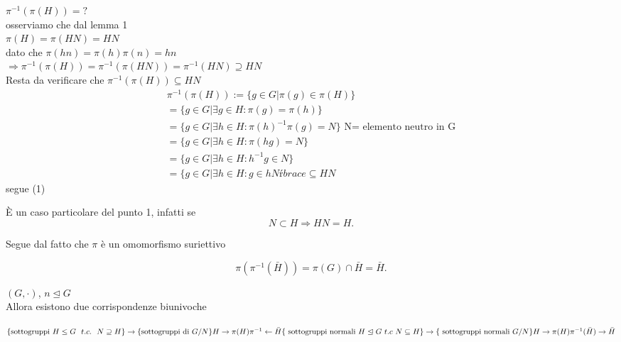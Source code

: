 \documentclass[12px]{article}
\begin{document}
	  \begin{dimo}[1]
		  $\pi^{-1}(\pi(H)) = ?$\\
		  osserviamo che dal lemma 1\\
		   $\pi(H) = \pi(HN) = HN$\\
		   dato che  $\pi(hn) = \pi(h)\pi(n) = hn$\\
		   $ \Rightarrow \pi^{-1}(\pi(H)) = \pi^{-1}(\pi(HN)) = \pi^{-1}(HN)\supseteq HN$ \\
		   Resta da verificare che $\pi^{-1}(\pi(H))\subseteq HN$\\
		    \begin{gather*}
			    \pi^{-1}(\pi(H)):=\lbrace g\in G|\pi(g)\in \pi(H)\rbrace\\
			    =\lbrace g\in G|\exists g\in H:\pi(g) = \pi(h)\rbrace\\
			    =\lbrace g\in G| \exists h\in H: \pi(h)^{-1}\pi(g)=N\rbrace \text{ N= elemento neutro in G}\\
			    =\lbrace g\in G|\exists h\in H: \pi(hg) = N\rbrace\\
			    =\lbrace g\in G | \exists h\in H: h^{-1}g\in N\rbrace\\
			    =\lbrace g\in G | \exists h\in H: g\in hNŕbrace \subseteq HN
		   \end{gather*}
		   segue (1)
	  \end{dimo}
	  \begin{dimo}[2]
	  	È un caso particolare del punto 1, infatti se
		\[
		N\subset H \Rightarrow HN = H
		.\] 
	  \end{dimo}
	  \begin{dimo}[3]
	  	Segue dal fatto che $\pi$ è un omomorfismo suriettivo 
		
		 \[
			 \pi(\pi^{-1}(\bar H))=\pi (G)\cap \bar H = \bar H
		.\] 
	  \end{dimo}
	  \begin{teo}
		$(G,\cdot)$, $n\trianglelefteq G$\\
		Allora esistono due corrispondenze biunivoche
		 \begin{center}
		 	
			 $\lbrace \text{sottogruppi } H\leq G \ \ t.c. \ \ N\supseteq H\rbrace \rightarrow \{\text{sottogruppi di } G/N\rbrace\\
			 H \rightarrow \pi (H)\\
			 \pi^{-1} \leftarrow \bar H\\
			 \lbrace \text{ sottogruppi normali } H\trianglelefteq G \ t.c \ N\subseteq H\rbrace \rightarrow \lbrace \text{ sottogruppi normali } G/N \rbrace\\
			 H \rightarrow \pi(H)\\
			 \pi^{-1}(\bar H) \rightarrow \bar H$
		 \end{center}
	  \end{teo}
\end{document}
